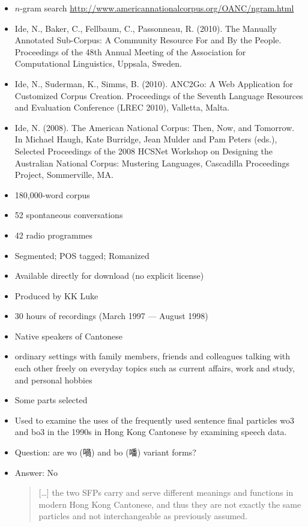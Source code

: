 \documentclass[a4paper,landscape,headrule,footrule,xetex]{foils}
\begin{document}
\begin{itemize} \small
\item $n$-gram search \url{http://www.americannationalcorpus.org/OANC/ngram.html}
\item  Ide, N., Baker, C., Fellbaum, C., Passonneau, R. (2010). The Manually Annotated Sub-Corpus: A Community Resource For and By the People. Proceedings of the 48th Annual Meeting of the Association for Computational Linguistics, Uppsala, Sweden.
\item  Ide, N., Suderman, K., Simms, B. (2010). ANC2Go: A Web Application for Customized Corpus Creation. Proceedings of the Seventh Language Resources and Evaluation Conference (LREC 2010), Valletta, Malta.
\item  Ide, N. (2008). The American National Corpus: Then, Now, and Tomorrow. In Michael Haugh, Kate Burridge, Jean Mulder and Pam Peters (eds.), Selected Proceedings of the 2008 HCSNet Workshop on Designing the Australian National Corpus: Mustering Languages, Cascadilla Proceedings Project, Sommerville, MA. 
\end{itemize}


\begin{itemize}
\item 180,000-word corpus
\item 52 spontaneous conversations
\item 42 radio programmes
\item Segmented; POS tagged; Romanized
\item Available directly for download (no explicit license)
\item Produced by KK Luke
\end{itemize}
\begin{itemize}
\item 30 hours of recordings (March 1997 --- August 1998)
\item Native speakers of Cantonese
\item ordinary settings with family members, friends and colleagues talking with each other freely on everyday topics such as current affairs, work and study, and personal hobbies
\item Some parts selected
\end{itemize}
\begin{itemize}
\item Used to examine the uses of the frequently used sentence final particles wo3 and bo3 in the 1990s in Hong Kong Cantonese by examining speech data.
\item Question: are wo (喎) and bo (噃) variant forms?
\item Answer: No
  \begin{quotation}
    {[\ldots]} the two SFPs carry and serve different meanings and functions in modern Hong Kong Cantonese, and thus they are not exactly the same particles and not interchangeable as previously assumed.
    \citep[p21]{Leung:2010}
  \end{quotation}

\end{itemize}
\end{document}

